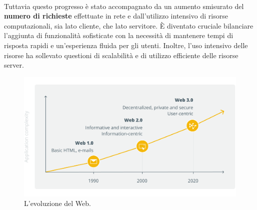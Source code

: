 \\Tuttavia questo progresso è stato accompagnato da un aumento smisurato del \textbf{numero di richieste} effettuate in rete e dall'utilizzo intensivo di risorse computazionali, sia lato cliente, che lato servitore.
È diventato cruciale bilanciare l'aggiunta di funzionalità sofisticate con la necessità di mantenere tempi di risposta rapidi e un'esperienza fluida per gli utenti. Inoltre, l'uso intensivo delle risorse ha sollevato questioni di scalabilità e di utilizzo efficiente delle risorse server.
\begin{figure}
        \begin{center}
                \includegraphics[width=0.9\columnwidth]{images/webEvolution.png}
        \end{center}
        \caption{L'evoluzione del Web.}
        \label{fig:spa}
\end{figure}
        
